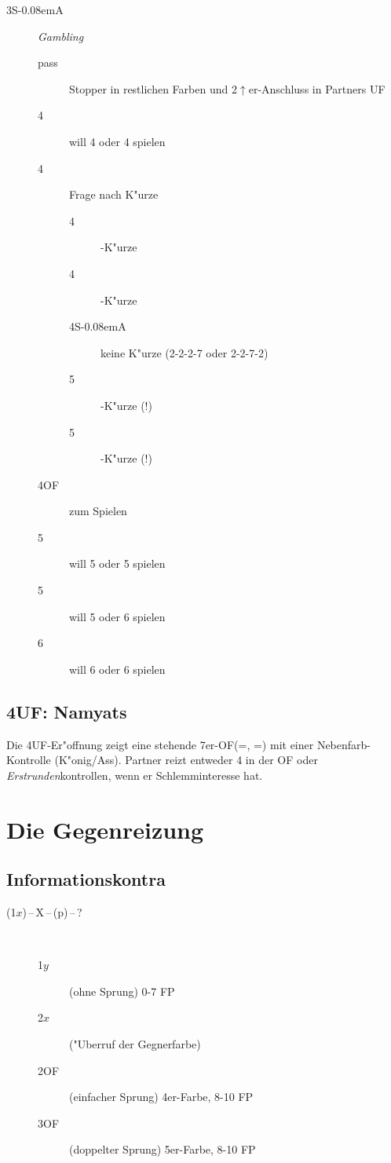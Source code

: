 \documentclass[11pt,german,twocolumn,twoside]{scrartcl}
\def\pi{\Sp\xspace}
\def\co{\He\xspace}
\def\ka{\Di\xspace}
\def\tr{\Cl\xspace}
\def\sa{\nobreak\textsf{S\kern-0.08emA}\xspace}
\def\ofa{\nobreak\textsf{OF}\xspace}
\def\ufa{\nobreak\textsf{UF}\xspace}
\def\pik{\nobreak\hspace{\cardskip}\Sp\xspace}
\def\coe{\nobreak\hspace{\cardskip}\He\xspace}
\def\kar{\nobreak\hspace{\cardskip}\Di\xspace}
\def\tre{\nobreak\hspace{\cardskip}\Cl\xspace}
\def\SA{\nobreak\hspace{\cardskip}\sa}
\def\of{\nobreak\hspace{\cardskip}\textsf{OF}\xspace}
\def\uf{\nobreak\hspace{\cardskip}\textsf{UF}\xspace}
\def\pl{$\uparrow$\xspace}
\def\any{$x$\xspace}
\def\anybid{\nobreak\hspace{\cardskip}\any}
\def\kontra{\textsf{X}\xspace}
\def\sep{\,--\,}
\newcommand{\conv}[1]{\emph{#1}}
\def\bdsc{\begin{description}}
\def\edsc{\end{description}}
\begin{document}
\bdsc
\item[3\SA] \conv{Gambling}
  \bdsc
  \item[pass] Stopper in restlichen Farben und 2\pl{}er-Anschluss in Partners \ufa
  \item[4\tre] will 4\tre oder 4\kar spielen
  \item[4\kar] Frage nach K"urze
    \bdsc
    \item[4\coe] \co-K"urze
    \item[4\pik] \pi-K"urze
    \item[4\SA] keine K"urze (2-2-2-7 oder 2-2-7-2)
    \item[5\tre] \ka-K"urze (!)
    \item[5\kar] \tr-K"urze (!)
    \edsc
  \item[4\of] zum Spielen
  \item[5\tre] will 5\tre oder 5\kar spielen
  \item[5\kar] will 5\kar oder 6\tre spielen
  \item[6\tre] will 6\tre oder 6\kar spielen
  \edsc
\edsc

\subsection{4\uf: Namyats}

Die 4\uf-Er"offnung zeigt eine stehende 7er-\ofa (\tr{}=\co, \ka{}=\pi) mit
einer Nebenfarb-Kontrolle (K"onig/Ass). Partner reizt entweder 4 in der \ofa
oder \emph{Erstrunden}kontrollen, wenn er Schlemminteresse hat.

\newpage
\section{Die Gegenreizung\label{gegenreizung}}

\subsection{Informationskontra}
\bdsc
\item[(1\anybid)\sep\kontra{}\sep{}(p)\sep{}?]~
  \bdsc
  \item[1\hspace{\cardskip}$y$] (ohne Sprung) 0-7 FP
  \item[2\anybid] ("Uberruf der Gegnerfarbe)
  \item[2\of] (einfacher Sprung) 4er-Farbe, 8-10 FP
  \item[3\of] (doppelter Sprung) 5er-Farbe, 8-10 FP
  \edsc
\edsc
\end{document}
